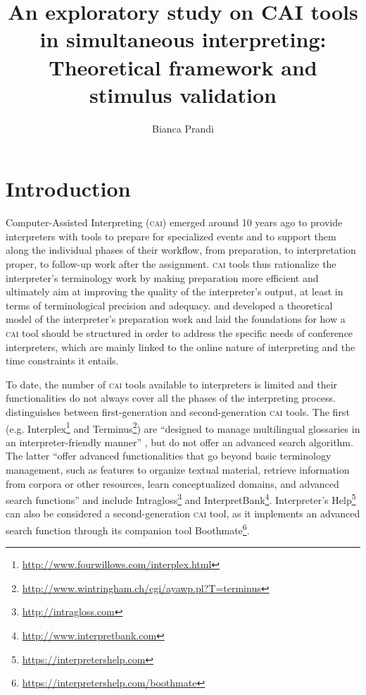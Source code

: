 \documentclass[output=paper]{langsci/langscibook}
\author{Bianca Prandi\affiliation{Mainz University}}
\title{An exploratory study on CAI tools in simultaneous interpreting: Theoretical framework and stimulus validation}
\begin{document}
\section{Introduction}\label{sec:prandi:1}
Computer-Assisted Interpreting (\textsc{cai}) emerged around 10 years ago to provide interpreters with tools to prepare for specialized events and to support them along the individual phases of their workflow, from preparation, to interpretation proper, to follow-up work after the assignment. \textsc{cai} tools thus rationalize the interpret\-er’s terminology work by making preparation more efficient and ultimately aim at improving the quality of the interpreter’s output, at least in terms of terminological precision and adequacy. \citet{Rütten2007} and \citet{Will2009} developed a theoretical model of the interpreter’s preparation work and laid the foundations for how a \textsc{cai} tool should be structured in order to address the specific needs of conference interpreters, which are mainly linked to the online nature of interpreting and the time constraints it entails.

To date, the number of \textsc{cai} tools available to interpreters is limited and their functionalities do not always cover all the phases of the interpreting process. \citet{Fantinuoli2018} distinguishes between first-generation and second-generation \textsc{cai} tools. The first (e.g. Interplex\footnote{\url{http://www.fourwillows.com/interplex.html}} and Terminus\footnote{\url{http://www.wintringham.ch/cgi/ayawp.pl?T=terminus}}) are ``designed to manage multilingual glossaries in an interpreter-friendly manner'' \citep[164]{Fantinuoli2018}, but do not offer an advanced search algorithm. The latter ``offer advanced functionalities that go beyond basic terminology management, such as features to organize textual material, retrieve information from corpora or other resources, learn conceptualized domains, and advanced search functions'' \citep[164]{Fantinuoli2018} and include Intragloss\footnote{\url{http://intragloss.com}} and InterpretBank\footnote{\url{http://www.interpretbank.com}}. Interpreter’s Help\footnote{\url{https://interpretershelp.com}} can also be considered a second-generation \textsc{cai} tool, as it implements an advanced search function through its companion tool Boothmate\footnote{\url{https://interpretershelp.com/boothmate}}. 
\end{document}
